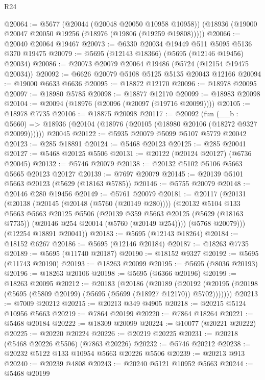 \begin{lexlean}{R24}
\begin{coremodule}
@20064 := @5677
    (@20044 (@20048 @20050 @10958 @10958))
    (@18936 (@19000 @20047 @20050 @19256 (@18976 (@19806 (@19259 @19808)))))
@20066 := @20040 @20064 @19467
@20073 := @6330 @20034 @19449 @511 @5095 @5136 @370 @19475
@20079 := @5695 (@12143 @18366) (@5695 (@12146 @19456) @20034)
@20086 := @20073 @20079 @20064 @19486 (@5724 (@12154 @19475 @20034))
@20092 := @6626 @20079 @5108 @5125 @5135 @20043 @12166
@20094 := @19000 @6633 @6636
@20095 := @18872 @12170
@20096 := @18978 @20095
@20097 := @18980 @5785
@20098 := @18877 @12170
@20099 := @18983 @20098
@20104 := @20094 (@18976 (@20096 (@20097 (@19716 @20099))))
@20105 := @18978 @7735
@20106 := @18875 @20098
@20117 := @20092
    (fun (__b : @5660) => @18936 (@20104 (@18976 (@20105 (@18980 @20106 (@18272 @9327 @20099))))))
    @20045
@20122 := @5935 @20079 @5099 @5107 @5779 @20042
@20123 := @285 @18891
@20124 := @5468 @20123
@20125 := @285 @20041
@20127 := @5468 @20125 @5506
@20131 := @20122 (@20124 @20127) (@6736 @20045)
@20132 := @5746 @20079
@20138 := @20132 @5102 @5106 @5663 @5665 @20123 @20127
@20139 := @7697 @20079
@20145 := @20139 @5101 @5663 @20123 (@5629 (@18163 @5785))
@20146 := @5755 @20079
@20148 := @20146 @280 @19456
@20149 := @5761 @20079
@20181 := @20117
    (@20131
      (@20138
        (@20145 (@20148 (@5760 (@20149 @280))))
        (@20132
          @5104
          @133
          @5663
          @5663
          @20125
          @5506
          (@20139
            @359
            @5663
            @20125
            (@5629 (@18163 @7735))
            (@20146 @254 @20014 (@5760 (@20149 @254))))
          (@5768 @20079)))
      (@12254 @18891 @20041))
@20183 := @5695 (@12143 @18264)
@20184 := @18152 @6267
@20186 := @5695 (@12146 @20184)
@20187 := @18263 @7735
@20189 := @5695 (@11740 @20187)
@20190 := @18152 @9327
@20192 := @5695 (@11743 @20190)
@20193 := @18263 @20099
@20195 := @5695 (@8036 @20193)
@20196 := @18263 @20106
@20198 := @5695 (@6366 @20196)
@20199 := @18263 @20095
@20212 := @20183
    (@20186
      (@20189
        (@20192 (@20195 (@20198 (@5695 (@5809 @20199) (@5695 (@5699 (@18927 @12170)) @5702)))))))
@20213 := @7009 @20212
@20215 := @20213 @349 @4905
@20218 := @20215 @5124 @10956 @5663
@20219 := @7864 @20199
@20220 := @7864 @18264
@20221 := @5468 @20184
@20222 := @18309 @20099
@20224 := @10077 (@20221 @20222)
@20225 := @20220 @20224
@20226 := @20219 @20225
@20231 := @20218 (@5468 @20226 @5506) (@7863 @20226)
@20232 := @5746 @20212
@20238 := @20232 @5122 @133 @10954 @5663 @20226 @5506
@20239 := @20213 @913
@20240 := @20239 @4808
@20243 := @20240 @5121 @10952 @5663
@20244 := @5468 @20199

\end{coremodule}
\end{lexlean}
